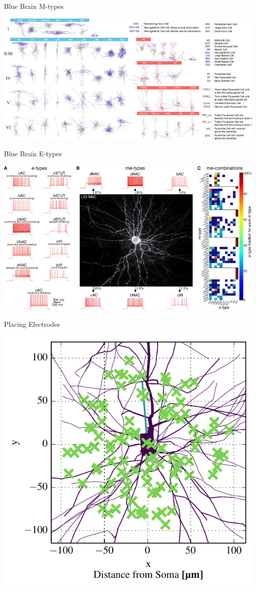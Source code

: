 \documentclass[aspectratio=169]{beamer}
\begin{document}
\begin{frame}{Blue Brain M-types}
    \begin{center}
        \includegraphics[width=\textwidth]{images/m-types.jpg}
    \end{center}
\end{frame}

\begin{frame}{Blue Brain E-types}
    \begin{center}
        \includegraphics[width=.9\textwidth]{images/e-types.jpg}
    \end{center}
\end{frame}

\begin{frame}{Placing Electrodes}
    \begin{center}
        \includegraphics[width=.5\textwidth]{images/sphere_morph_elec_xy.pdf}
    \end{center}
\end{frame}
\end{document}
